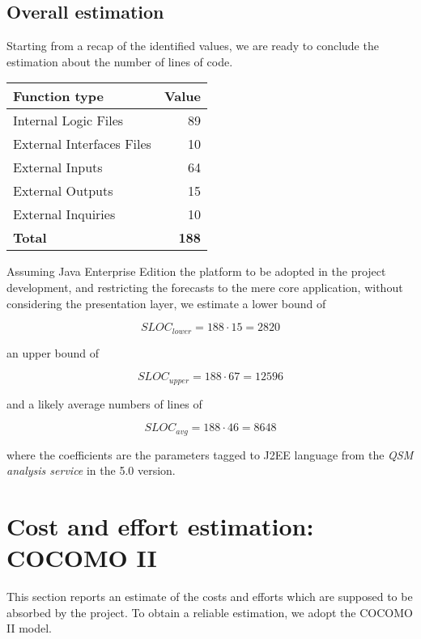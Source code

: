 \documentclass{scrreprt}
\begin{document}
\subsection{Overall estimation}
Starting from a recap of the identified values, we are ready to conclude the estimation about the number of lines of code.

\begin{center}
\begin{tabular}{lr}
\toprule \textbf{Function type}&\textbf{Value}\\ \midrule
Internal Logic Files & 89\\ 
External Interfaces Files & 10\\ 
External Inputs&64\\ 
External Outputs&15\\ 
External Inquiries&10\\ \midrule
\textbf{Total}&\textbf{188}\\
\bottomrule
\end{tabular}
\end{center}

Assuming Java Enterprise Edition the platform to be adopted in the project development, and restricting the forecasts to the mere core application, without considering the presentation layer, we estimate a lower bound of

\[
 SLOC_{lower}=188\cdot 15=2820
\]

an upper bound of

\[
SLOC_{upper}=188\cdot 67=12596
\]

and a likely average numbers of lines of

\[
SLOC_{avg}=188\cdot 46=8648
\]

where the coefficients are the parameters tagged to J2EE language from the \emph{QSM analysis service} in the 5.0 version.


\section{Cost and effort estimation: COCOMO II}
This section reports an estimate of the costs and efforts which are supposed to be absorbed by the project. To obtain a reliable estimation, we adopt the COCOMO II model.
\end{document}
